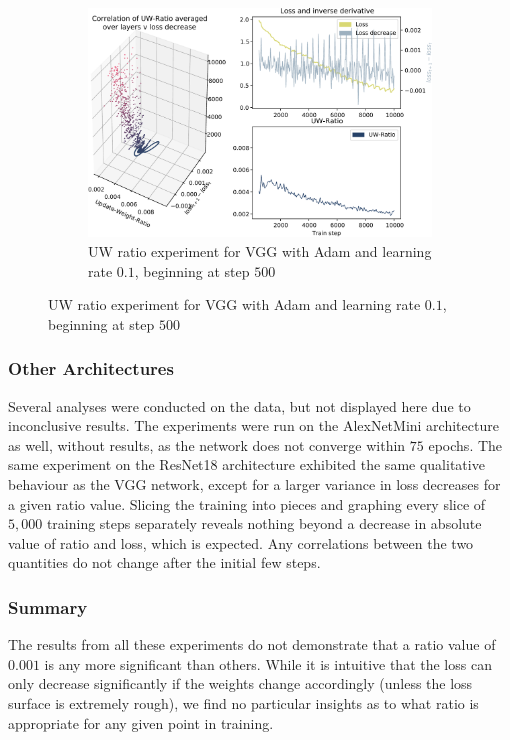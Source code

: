 \begin{figure}
    \begin{subfigure}{\textwidth}
        \centering
        \includegraphics[width=\linewidth]{gfx/diagrams/experiments/ratio_loss_correlation/vgg_adam_01_500_10000.pdf}
        \caption{UW ratio experiment for VGG with Adam and learning rate $0.1$,
        beginning at step $500$}
        \label{fig:ratio_loss_corr_vgg_adam_01_500}
    \end{subfigure}
\end{figure}

\subsubsection{Other Architectures}

Several analyses were conducted on the data, but not displayed here due to
inconclusive results.
The experiments were run on the AlexNetMini architecture as well, without
results, as the network does not converge within $75$ epochs.
The same experiment on the ResNet18 architecture exhibited the same qualitative
behaviour as the VGG network, except for a larger variance in loss decreases for
a given ratio value. Slicing the training into pieces and graphing every slice
of $5,000$ training steps separately reveals nothing beyond a decrease in
absolute value of ratio and loss, which is expected. Any correlations between
the two quantities do not change after the initial few steps.

\subsubsection{Summary}

The results from all these experiments do not demonstrate that a ratio value
of $0.001$ is any more significant than others. While it is intuitive that the loss
can only decrease significantly if the weights change accordingly (unless the
loss surface is extremely rough), we find no particular insights as to what
ratio is appropriate for any given point in training.

